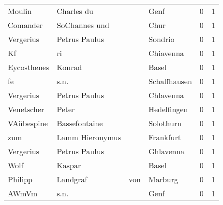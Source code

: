 \begin{tabular}{llllrr}
                   Moulin &                         Charles du &             &                                        Genf &          0 &         1 \\
                 Comander &                      SoChannes und &             &                                        Chur &          0 &         1 \\
                Vergerius &                      Petrus Paulus &             &                                     Sondrio &          0 &         1 \\
                       Kf &                                 ri &             &                                   Chiavenna &          0 &         1 \\
              Eycosthenes &                             Konrad &             &                                       Basel &          0 &         1 \\
                       fe &                               s.n. &             &                                Schaffhausen &          0 &         1 \\
                Vergerius &                      Petrus Paulus &             &                                   Chlavenna &          0 &         1 \\
               Venetscher &                              Peter &             &                                 Hedelfingen &          0 &         1 \\
               VAübespine &                      Bassefontaine &             &                                   Solothurn &          0 &         1 \\
                      zum &                    Lamm Hieronymus &             &                                   Frankfurt &          0 &         1 \\
                Vergerius &                      Petrus Paulus &             &                                   Ghlavenna &          0 &         1 \\
                     Wolf &                             Kaspar &             &                                       Basel &          0 &         1 \\
                  Philipp &                           Landgraf &         von &                                     Marburg &          0 &         1 \\
                    AWmVm &                               s.n. &             &                                        Genf &          0 &         1 \\

\end{tabular}
